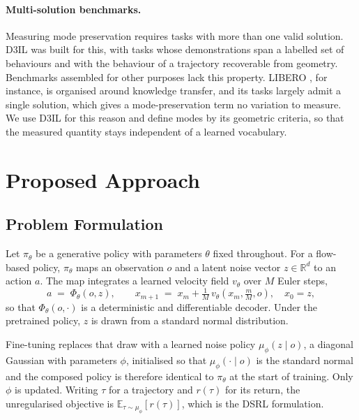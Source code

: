 \documentclass[preprint,12pt]{elsarticle}
\begin{document}
\paragraph{Multi-solution benchmarks.}
Measuring mode preservation requires tasks with more than one valid solution.
D3IL \citep{jia2024d3il} was built for this, with tasks whose demonstrations span
a labelled set of behaviours and with the behaviour of a trajectory recoverable
from geometry. Benchmarks assembled for other purposes lack this property. LIBERO \citep{liu2023libero}, for instance, is organised around
knowledge transfer, and its tasks largely admit a single solution, which gives a
mode-preservation term no variation to measure. We use D3IL for this reason and
define modes by its geometric criteria, so that the measured quantity stays
independent of a learned vocabulary.

\section{Proposed Approach}\label{sec:approach}

\subsection{Problem Formulation}\label{sec:problem}

Let $\pi_\theta$ be a generative policy with parameters $\theta$ fixed throughout.
For a flow-based policy, $\pi_\theta$ maps an observation $o$ and a latent noise
vector $z \in \mathbb{R}^{d}$ to an action $a$. The map integrates a learned
velocity field $v_\theta$ over $M$ Euler steps,
\begin{equation}\label{eq:decode}
  a \;=\; \Phi_\theta(o, z), \qquad
  x_{m+1} \;=\; x_m + \tfrac{1}{M}\, v_\theta\!\left(x_m, \tfrac{m}{M}, o\right),
  \quad x_0 = z,
\end{equation}
so that $\Phi_\theta(o, \cdot)$ is a deterministic and differentiable decoder.
Under the pretrained policy, $z$ is drawn from a standard normal distribution.

Fine-tuning replaces that draw with a learned noise policy $\mu_\phi(z \mid o)$,
a diagonal Gaussian with parameters $\phi$, initialised so that
$\mu_\phi(\cdot \mid o)$ is the standard normal and the composed policy is
therefore identical to $\pi_\theta$ at the start of training. Only $\phi$ is
updated. Writing $\tau$ for a trajectory and $r(\tau)$ for its return, the
unregularised objective is $\mathbb{E}_{\tau \sim \mu_\phi}[r(\tau)]$, which is
the DSRL formulation.
\end{document}

